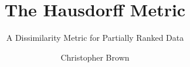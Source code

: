 \documentclass[pdf,usenames,dvipsnames,tikz]{beamer}%
\title{The Hausdorff Metric}
\subtitle{A Dissimilarity Metric for Partially Ranked Data}
\author{Christopher Brown}
\date{}
\begin{document}
\begin{frame}
	\titlepage
\end{frame}
\end{document}

